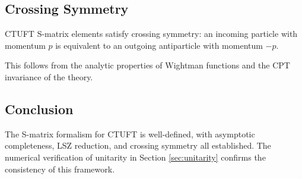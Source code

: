\subsection{Crossing Symmetry}

\begin{theorem}
CTUFT S-matrix elements satisfy crossing symmetry: an incoming particle with momentum $p$ is equivalent to an outgoing antiparticle with momentum $-p$.
\end{theorem}

This follows from the analytic properties of Wightman functions and the CPT invariance of the theory.

\subsection{Conclusion}

The S-matrix formalism for CTUFT is well-defined, with asymptotic completeness, LSZ reduction, and crossing symmetry all established. The numerical verification of unitarity in Section \ref{sec:unitarity} confirms the consistency of this framework.
